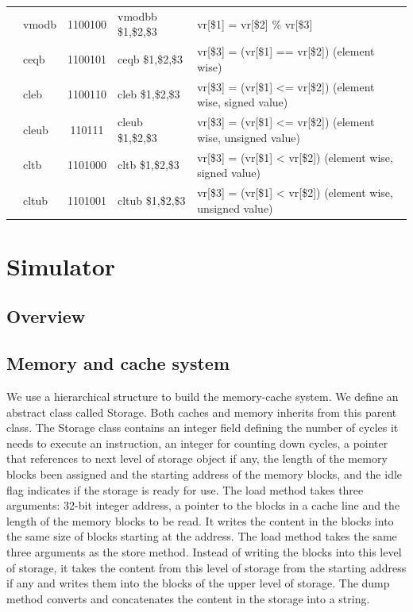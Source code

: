 \documentclass{sig-alternate}
\begin{document}
\begin{table}
\begin{tabular}{|c|l|c|l|l|}
 & vmodb & 1100100 & vmodbb \$1,\$2,\$3 & vr[\$1] = vr[\$2] \% vr[\$3] \\ \cline{2-5}
 & ceqb & 1100101 & ceqb \$1,\$2,\$3 & vr[\$3] = (vr[\$1] == vr[\$2]) (element wise)\\ \cline{2-5}  
 & cleb & 1100110 & cleb \$1,\$2,\$3&vr[\$3] = (vr[\$1] <= vr[\$2]) (element wise, signed value)  \\ \cline{2-5}
 & cleub & 110111 & cleub \$1,\$2,\$3 & vr[\$3] = (vr[\$1] <= vr[\$2]) (element wise, unsigned value) \\ \cline{2-5}
 & cltb & 1101000 & cltb \$1,\$2,\$3 & vr[\$3] = (vr[\$1] < vr[\$2]) (element wise, signed value) \\ \cline{2-5}
 & cltub & 1101001 & cltub \$1,\$2,\$3 &vr[\$3] = (vr[\$1] < vr[\$2]) (element wise, unsigned value) \\ \hline
\end{tabular}
\end{table}


\section{Simulator}
\subsection{Overview}
\subsection{Memory and cache system}
We use a hierarchical structure to build the memory-cache system. We define an abstract class called Storage. Both caches and memory inherits from this parent class. The Storage class contains an integer field defining the number of cycles it needs to execute an instruction, an integer for counting down cycles, a pointer that references to next level of storage object if any, the length of the memory blocks been assigned and the starting address of the memory blocks, and the idle flag indicates if the storage is ready for use. The load method takes three arguments: 32-bit integer address, a pointer to the  blocks in a cache line and the length of the memory blocks to be read. It writes the content in the blocks into the same size of blocks starting at the address. The load method takes the same three arguments as the store method. Instead of writing the blocks into this level of storage, it takes the content from this level of storage from the starting address if any and writes them into the blocks of the upper level of storage. The dump method converts and concatenates the content in the storage into a string. 
\end{document}
